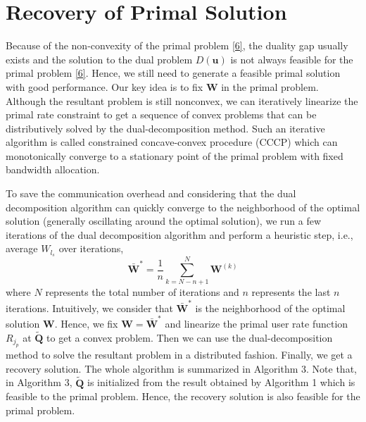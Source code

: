 \documentclass[12pt,onecolumn,tworows]{IEEEtran}
\begin{document}
\section{Recovery of Primal Solution }
Because of the non-convexity of the primal problem \eqref{6}, the duality gap usually exists and the solution to the dual problem $D({\mathbf{u}})$ is not always feasible for the primal problem \eqref{6}. Hence, we still need to generate a feasible primal solution with good performance. Our key idea is to fix $\mathbf{W}$ in the primal problem. Although the resultant problem is still nonconvex, we can iteratively linearize the primal rate constraint to get a sequence of convex problems that can be distributively solved by the dual-decomposition method. Such an iterative algorithm is called constrained concave-convex procedure (CCCP)\cite{CCCP_convergence} which can monotonically converge to a stationary point of the primal problem with fixed bandwidth allocation.

To save the communication overhead and considering that the dual decomposition algorithm can quickly converge to the neighborhood of the optimal solution (generally oscillating around the optimal solution), we run a few iterations of the dual decomposition algorithm and perform a heuristic step, i.e., average $W_{l_s}$ over iterations,
\begin{equation}\label{heuristic}
{{\mathbf{\bar W}}^*} = \frac{1}{n}{{\sum\limits_{k = N - n + 1}^N {{{\mathbf{W}}^{(k)}}} }}
\end{equation}
where $N$ represents the total number of iterations and $n$ represents the last $n$ iterations. Intuitively, we consider that ${{\mathbf{\bar W}}^*}$ is the neighborhood of the optimal solution ${\mathbf{W}}$. Hence, we fix $\mathbf{W}=\bar{\mathbf{W}}^*$ and linearize the primal user rate function $R_{j_p}$ at ${\mathbf{\tilde Q}}$ to get a convex problem. Then we can use the dual-decomposition method to solve the resultant problem in a distributed fashion. Finally, we get a recovery solution. The whole algorithm is summarized in Algorithm 3. Note that, in Algorithm 3, ${\mathbf{\tilde Q}}$ is initialized from the result obtained by Algorithm 1 which is feasible to the primal problem. Hence, the recovery solution is also feasible for the primal problem\cite{CCCP_convergence}.
\end{document}
